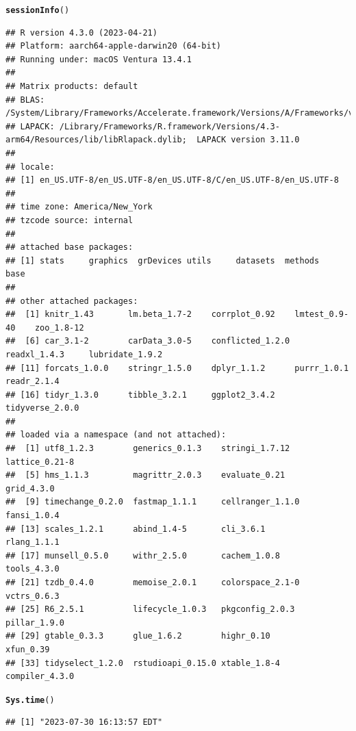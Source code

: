 \documentclass{article}\usepackage[]{graphicx}\usepackage[]{xcolor}
\makeatletter
\newcommand{\hlstd}[1]{\textcolor[rgb]{0.345,0.345,0.345}{#1}}%
\newcommand{\hlkwd}[1]{\textcolor[rgb]{0.737,0.353,0.396}{\textbf{#1}}}%
\newenvironment{kframe}{%
 \def\at@end@of@kframe{}%
 \ifinner\ifhmode%
  \def\at@end@of@kframe{\end{minipage}}%
  \begin{minipage}{\columnwidth}%
 \fi\fi%
 \def\FrameCommand##1{\hskip\@totalleftmargin \hskip-\fboxsep
 \colorbox{shadecolor}{##1}\hskip-\fboxsep
     \hskip-\linewidth \hskip-\@totalleftmargin \hskip\columnwidth}%
 \MakeFramed {\advance\hsize-\width
   \@totalleftmargin\z@ \linewidth\hsize
   \@setminipage}}%
 {\par\unskip\endMakeFramed%
 \at@end@of@kframe}
\newenvironment{knitrout}{}{} %
\makeatother
\begin{document}
\begin{knitrout}
\color{fgcolor}\begin{kframe}
\begin{alltt}
\hlkwd{sessionInfo}\hlstd{()}
\end{alltt}
\begin{verbatim}
## R version 4.3.0 (2023-04-21)
## Platform: aarch64-apple-darwin20 (64-bit)
## Running under: macOS Ventura 13.4.1
## 
## Matrix products: default
## BLAS:   /System/Library/Frameworks/Accelerate.framework/Versions/A/Frameworks/vecLib.framework/Versions/A/libBLAS.dylib 
## LAPACK: /Library/Frameworks/R.framework/Versions/4.3-arm64/Resources/lib/libRlapack.dylib;  LAPACK version 3.11.0
## 
## locale:
## [1] en_US.UTF-8/en_US.UTF-8/en_US.UTF-8/C/en_US.UTF-8/en_US.UTF-8
## 
## time zone: America/New_York
## tzcode source: internal
## 
## attached base packages:
## [1] stats     graphics  grDevices utils     datasets  methods   base     
## 
## other attached packages:
##  [1] knitr_1.43       lm.beta_1.7-2    corrplot_0.92    lmtest_0.9-40    zoo_1.8-12      
##  [6] car_3.1-2        carData_3.0-5    conflicted_1.2.0 readxl_1.4.3     lubridate_1.9.2 
## [11] forcats_1.0.0    stringr_1.5.0    dplyr_1.1.2      purrr_1.0.1      readr_2.1.4     
## [16] tidyr_1.3.0      tibble_3.2.1     ggplot2_3.4.2    tidyverse_2.0.0 
## 
## loaded via a namespace (and not attached):
##  [1] utf8_1.2.3        generics_0.1.3    stringi_1.7.12    lattice_0.21-8   
##  [5] hms_1.1.3         magrittr_2.0.3    evaluate_0.21     grid_4.3.0       
##  [9] timechange_0.2.0  fastmap_1.1.1     cellranger_1.1.0  fansi_1.0.4      
## [13] scales_1.2.1      abind_1.4-5       cli_3.6.1         rlang_1.1.1      
## [17] munsell_0.5.0     withr_2.5.0       cachem_1.0.8      tools_4.3.0      
## [21] tzdb_0.4.0        memoise_2.0.1     colorspace_2.1-0  vctrs_0.6.3      
## [25] R6_2.5.1          lifecycle_1.0.3   pkgconfig_2.0.3   pillar_1.9.0     
## [29] gtable_0.3.3      glue_1.6.2        highr_0.10        xfun_0.39        
## [33] tidyselect_1.2.0  rstudioapi_0.15.0 xtable_1.8-4      compiler_4.3.0
\end{verbatim}
\begin{alltt}
\hlkwd{Sys.time}\hlstd{()}
\end{alltt}
\begin{verbatim}
## [1] "2023-07-30 16:13:57 EDT"
\end{verbatim}
\end{kframe}
\end{knitrout}
\end{document}
